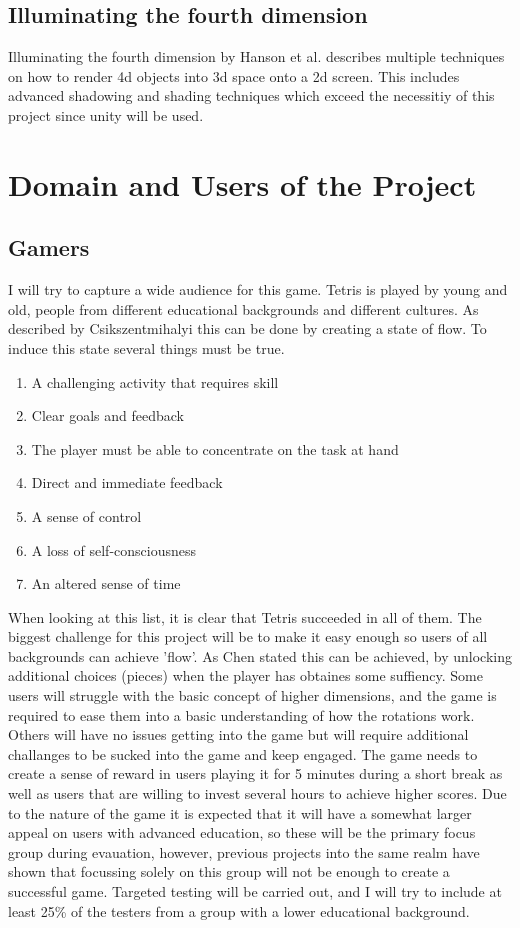 \documentclass{article}
\begin{document}
\subsection{Illuminating the fourth dimension} Illuminating the fourth dimension by Hanson et al. \cite{4d_vis_3} describes multiple techniques on how to render 4d objects into 3d space onto a 2d screen. This includes advanced shadowing and shading techniques which exceed the necessitiy of this project since unity will be used.
\newpage



\section{Domain and Users of the Project}
\subsection{Gamers}
I will try to capture a wide audience for this game. 
Tetris is played by young and old, people from different educational backgrounds and different cultures.
As described by Csikszentmihalyi \cite{flow} this can be done by creating a state of flow. To induce this state several things must be true.
\begin{enumerate}
    \item A challenging activity that requires skill
    \item Clear goals and feedback
    \item The player must be able to concentrate on the task at hand
    \item Direct and immediate feedback
    \item A sense of control
    \item A loss of self-consciousness
    \item An altered sense of time
\end{enumerate}
When looking at this list, it is clear that Tetris succeeded in all of them. The biggest challenge for this project will be to make it easy enough so users of all backgrounds can achieve 'flow'. As Chen \cite{flow_2} stated this can be achieved, by unlocking additional choices (pieces) when the player has obtaines some suffiency. Some users will struggle with the basic concept of higher dimensions, and the game is required to ease them into a basic understanding of how the rotations work. Others will have no issues getting into the game but will require additional challanges to be sucked into the game and keep engaged. The game needs to create a sense of reward in users playing it for 5 minutes during a short break as well as users that are willing to invest several hours to achieve higher scores. Due to the nature of the game it is expected that it will have a somewhat larger appeal on users with advanced education, so these will be the primary focus group during evauation, however, previous projects into the same realm have shown that focussing solely on this group will not be enough to create a successful game. Targeted testing will be carried out, and I will try to include at least 25\% of the testers from a group with a lower educational background.
\end{document}
